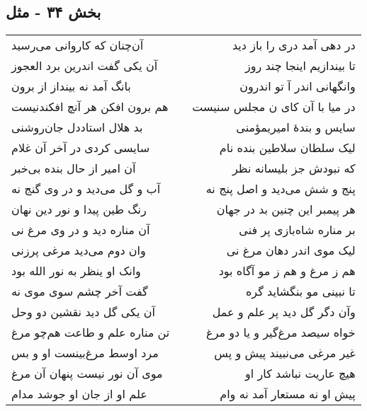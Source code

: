 \begin{center}
\section*{بخش ۳۴ - مثل}
\label{sec:sh034}
\begin{longtable}{l p{0.5cm} r}
آن‌چنان که کاروانی می‌رسید
&&
در دهی آمد دری را باز دید
\\
آن یکی گفت اندرین برد العجوز
&&
تا بیندازیم اینجا چند روز
\\
بانگ آمد نه بینداز از برون
&&
وانگهانی اندر آ تو اندرون
\\
هم برون افکن هر آنچ افکندنیست
&&
در میا با آن کای ن مجلس سنیست
\\
بد هلال استاددل جان‌روشنی
&&
سایس و بندهٔ امیریمؤمنی
\\
سایسی کردی در آخر آن غلام
&&
لیک سلطان سلاطین بنده نام
\\
آن امیر از حال بنده بی‌خبر
&&
که نبودش جز بلیسانه نظر
\\
آب و گل می‌دید و در وی گنج نه
&&
پنج و شش می‌دید و اصل پنج نه
\\
رنگ طین پیدا و نور دین نهان
&&
هر پیمبر این چنین بد در جهان
\\
آن مناره دید و در وی مرغ نی
&&
بر مناره شاه‌بازی پر فنی
\\
وان دوم می‌دید مرغی پرزنی
&&
لیک موی اندر دهان مرغ نی
\\
وانک او ینظر به نور الله بود
&&
هم ز مرغ و هم ز مو آگاه بود
\\
گفت آخر چشم سوی موی نه
&&
تا نبینی مو بنگشاید گره
\\
آن یکی گل دید نقشین دو وحل
&&
وآن دگر گل دید پر علم و عمل
\\
تن مناره علم و طاعت هم‌چو مرغ
&&
خواه سیصد مرغ‌گیر و یا دو مرغ
\\
مرد اوسط مرغ‌بینست او و بس
&&
غیر مرغی می‌نبیند پیش و پس
\\
موی آن نور نیست پنهان آن مرغ
&&
هیچ عاریت نباشد کار او
\\
علم او از جان او جوشد مدام
&&
پیش او نه مستعار آمد نه وام
\\
\end{longtable}
\end{center}
